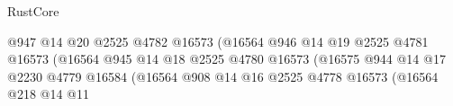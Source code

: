 \begin{lexlean}{RustCore}
\begin{coremodule}
                                                            @947
                                                            @14
                                                            @20
                                                            @2525
                                                            @4782
                                                            @16573
                                                            (@16564
                                                              @946
                                                              @14
                                                              @19
                                                              @2525
                                                              @4781
                                                              @16573
                                                              (@16564
                                                                @945
                                                                @14
                                                                @18
                                                                @2525
                                                                @4780
                                                                @16573
                                                                (@16575
                                                                  @944
                                                                  @14
                                                                  @17
                                                                  @2230
                                                                  @4779
                                                                  @16584
                                                                  (@16564
                                                                    @908
                                                                    @14
                                                                    @16
                                                                    @2525
                                                                    @4778
                                                                    @16573
                                                                    (@16564
                                                                      @218
                                                                      @14
                                                                      @11

\end{coremodule}
\end{lexlean}

